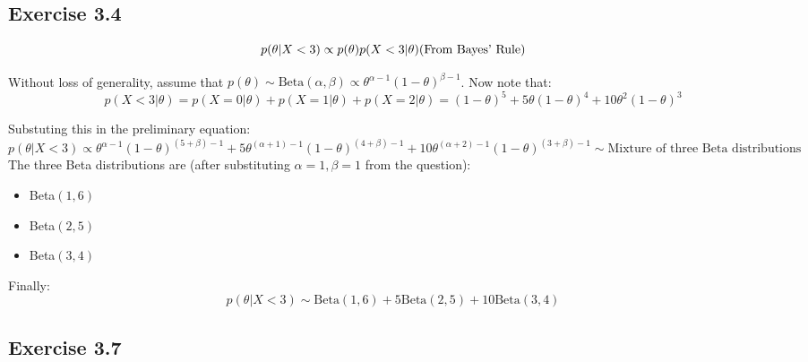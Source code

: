 \documentclass{article}
\begin{document}
\subsection*{Exercise 3.4}
\begin{flushleft}
\begin{equation*}
p(\theta | X < 3) \propto p(\theta) p(X < 3 | \theta) \hfill \text{(From Bayes' Rule)}
\end{equation*}

Without loss of generality, assume that \(p(\theta) \sim \mathrm{Beta}(\alpha, \beta) \propto \theta^{\alpha - 1} (1 - \theta)^{\beta - 1}\). Now note that:
\begin{equation}
p(X < 3 | \theta) = p(X = 0 | \theta) + p(X = 1 | \theta) + p(X = 2 | \theta) = (1 - \theta)^{5} + 5\theta(1 - \theta)^{4} + 10\theta^{2}(1 - \theta)^{3}
\end{equation}

Substuting this in the preliminary equation:
\begin{equation}
p(\theta | X < 3) \propto \theta^{\alpha - 1}(1 - \theta)^{(5 + \beta) - 1} + 5\theta^{(\alpha + 1) - 1}(1 - \theta)^{(4 + \beta) - 1} + 10\theta^{(\alpha + 2) - 1}(1 - \theta)^{(3 + \beta) - 1} \sim \text{Mixture of three Beta distributions}
\end{equation}
The three Beta distributions are (after substituting \(\alpha = 1, \beta = 1\) from the question):
\begin{itemize}
\item Beta\((1, 6)\) \item Beta\((2, 5)\) \item Beta\((3, 4)\)
\end{itemize}
Finally:
\[p(\theta | X < 3) \sim \text{Beta}(1, 6) + 5\text{Beta}(2, 5) + 10\text{Beta}(3, 4)\]
\end{flushleft}

\subsection*{Exercise 3.7}
\end{document}
